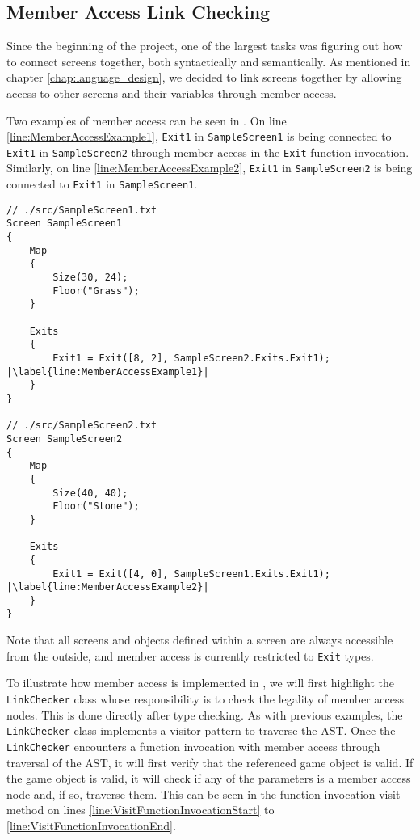 \subsection*{Member Access Link Checking} \label{sec:Linker}
Since the beginning of the project, one of the largest tasks was figuring out how to connect screens together, both syntactically and semantically. 
As mentioned in chapter \ref{chap:language_design}, we decided to link screens together by allowing access to other screens and their variables through member access. 


Two examples of member access can be seen in . 
On line \ref{line:MemberAccessExample1}, \texttt{Exit1} in \texttt{SampleScreen1} is being connected to \texttt{Exit1} in \texttt{SampleScreen2} through member access in the \texttt{Exit} function invocation.
Similarly, on line \ref{line:MemberAccessExample2}, \texttt{Exit1} in \texttt{SampleScreen2} is being connected to \texttt{Exit1} in \texttt{SampleScreen1}.

\begin{lstlisting}[language=CSharp, caption={\dazel{} source code example of member access.}, label={lst:LinkingExample},escapechar=|]
// ./src/SampleScreen1.txt
Screen SampleScreen1 
{
	Map 
	{
		Size(30, 24);
		Floor("Grass");
	}
	
	Exits 
	{
		Exit1 = Exit([8, 2], SampleScreen2.Exits.Exit1); |\label{line:MemberAccessExample1}|
	}
}

// ./src/SampleScreen2.txt
Screen SampleScreen2
{
	Map 
	{
		Size(40, 40);
		Floor("Stone");
	}
	
	Exits 
	{
		Exit1 = Exit([4, 0], SampleScreen1.Exits.Exit1); |\label{line:MemberAccessExample2}|
	}
}
\end{lstlisting}

Note that all screens and objects defined within a screen are always accessible from the outside, and member access is currently restricted to \texttt{Exit} types.

To illustrate how member access is implemented in \dazel{}, we will first highlight the \texttt{LinkChecker} class whose responsibility is to check the legality of member access nodes. This is done directly after type checking.
As with previous examples, the \texttt{LinkChecker} class implements a visitor pattern to traverse the AST.
Once the \texttt{LinkChecker} encounters a function invocation with member access through traversal of the AST, it will first verify that the referenced game object is valid. 
If the game object is valid, it will check if any of the parameters is a member access node and, if so, traverse them. This can be seen in the function invocation visit method on lines \ref{line:VisitFunctionInvocationStart} to \ref{line:VisitFunctionInvocationEnd}. 

